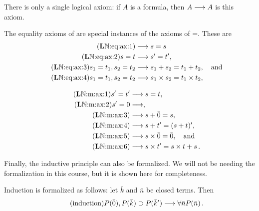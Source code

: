 \documentclass[11pt,a4paper]{article}
\begin{document}
\begin{axiom}\label{axi:logical axioms of PA}
    There is only a single logical axiom: if \(A\) is a formula,
    then \(A\longrightarrow A\) is this axiom.
\end{axiom}
\begin{axiom}\label{axi:equality axioms of PA}
    The equality axioms of \PA{} are special instances of the axioms
    of \LK=. These are
    \begin{align}
        \tag{\LN:eq:ax:1}\label{LN:eq:ax:1}
        &\seq s=s \\
        \tag{\LN:eq:ax:2}\label{LN:eq:ax:2}
        s = t &\seq s'=t', \\
        \tag{\LN:eq:ax:3}\label{LN:eq:ax:3}
        s_1=t_1, s_2=t_2 &\seq s_1+s_2 =t_1+t_2,
        \quad\text{and} \\
        \tag{\LN:eq:ax:4}\label{LN:eq:ax:4}
        s_1=t_1, s_2=t_2 &\seq s_1\times s_2 =t_1\times t_2,
    \end{align}
\end{axiom}
\begin{axiom}\label{axi:mathematical axioms of PA}
    \begin{align}
        \tag{\LN:m:ax:1}\label{LN:m:ax:1}
        s'=t'&\seq s=t, \\
        \tag{\LN:m:ax:2}\label{LN:m:ax:2}
        s' = 0 &\seq, \\
        \tag{\LN:m:ax:3}\label{LN:m:ax:3}
        &\seq s + \bar0 = s, \\
        \tag{\LN:m:ax:4}\label{LN:m:ax:4}
        &\seq s + t' = (s+t)', \\
        \tag{\LN:m:ax:5}\label{LN:m:ax:5}
        &\seq s\times\bar0 = \bar0,
        \quad\text{and} \\
        \tag{\LN:m:ax:6}\label{LN:m:ax:6}
        &\seq s\times t' = s \times t + s\,.
    \end{align}
\end{axiom}

Finally, the inductive principle can also be formalized.
We will not be needing the formalization in this course,
but it is shown here for completeness.

\begin{axiom}\label{axi:inductive axiom}
    Induction is formalized as follows:
    let \(\bar k\) and \(\bar n\) be closed terms. Then
    \begin{equation}\tag{induction}\label{induction}
        P(\bar0), P(\bar k)\supset P(\bar k') \longrightarrow \forall\bar nP(\bar n)\,.
    \end{equation}
\end{axiom}
\end{document}
